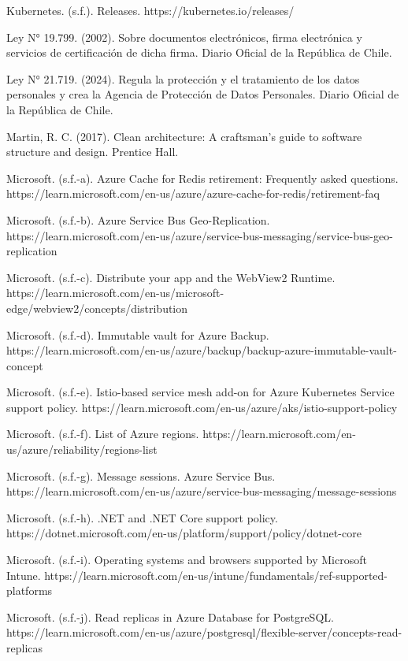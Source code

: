 \documentclass[subdoc]{../../comun/overfore}
\begin{document}
\begin{referencias}
\item Kubernetes. (s.f.). Releases. https://kubernetes.io/releases/
\item Ley N° 19.799. (2002). Sobre documentos electrónicos, firma electrónica y servicios de certificación de dicha firma. Diario Oficial de la República de Chile.
\item Ley N° 21.719. (2024). Regula la protección y el tratamiento de los datos personales y crea la Agencia de Protección de Datos Personales. Diario Oficial de la República de Chile.
\item Martin, R. C. (2017). Clean architecture: A craftsman's guide to software structure and design. Prentice Hall.
\item Microsoft. (s.f.-a). Azure Cache for Redis retirement: Frequently asked questions. https://learn.microsoft.com/en-us/azure/azure-cache-for-redis/retirement-faq
\item Microsoft. (s.f.-b). Azure Service Bus Geo-Replication. https://learn.microsoft.com/en-us/azure/service-bus-messaging/service-bus-geo-replication
\item Microsoft. (s.f.-c). Distribute your app and the WebView2 Runtime. https://learn.microsoft.com/en-us/microsoft-edge/webview2/concepts/distribution
\item Microsoft. (s.f.-d). Immutable vault for Azure Backup. https://learn.microsoft.com/en-us/azure/backup/backup-azure-immutable-vault-concept
\item Microsoft. (s.f.-e). Istio-based service mesh add-on for Azure Kubernetes Service support policy. https://learn.microsoft.com/en-us/azure/aks/istio-support-policy
\item Microsoft. (s.f.-f). List of Azure regions. https://learn.microsoft.com/en-us/azure/reliability/regions-list
\item Microsoft. (s.f.-g). Message sessions. Azure Service Bus. https://learn.microsoft.com/en-us/azure/service-bus-messaging/message-sessions
\item Microsoft. (s.f.-h). .NET and .NET Core support policy. https://dotnet.microsoft.com/en-us/platform/support/policy/dotnet-core
\item Microsoft. (s.f.-i). Operating systems and browsers supported by Microsoft Intune. https://learn.microsoft.com/en-us/intune/fundamentals/ref-supported-platforms
\item Microsoft. (s.f.-j). Read replicas in Azure Database for PostgreSQL. https://learn.microsoft.com/en-us/azure/postgresql/flexible-server/concepts-read-replicas

\end{referencias}
\end{document}

